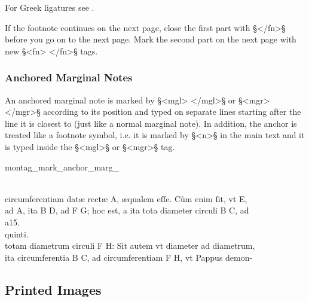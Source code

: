 \begin{crossref}
For Greek ligatures see .
\end{crossref}

\begin{note}
If the footnote continues on the next page, close the first part with §</fn>§ before you go on to the next page. Mark the second part on the next page with new §<fn> </fn>§ tags.
\end{note}


\subsubsection{Anchored Marginal Notes}
\label{section anchored marginal notes}

\begin{mainruleLessImportant}
An anchored marginal note is marked by §<mgl> </mgl>§ or §<mgr> </mgr>§ according to its position and typed on separate lines starting after the line it is closest to (just like a normal marginal note). In addition, the anchor is treated like a footnote symbol, i.e. it is marked by §<n>§ in the main text and it is typed inside the §<mgl>§ or §<mgr>§ tag.
\end{mainruleLessImportant}

\begin{sampleImage}{montag_mark_anchor_marg_} %
\begin{typeLatin}
 \someText \\
circumferentiam datæ rectæ A, æqualem eſſe. Cùm enim ſit, vt E,\\
ad A, ita B D, ad F G; hoc est,  \bold{_}a\bold{_}\bold{>} ita tota diameter circuli B C, ad\\
 a\bold{>}15.\\
\bold{_}quinti\bold{_}.\\
totam diametrum circuli F H: Sit autem vt diameter ad diametrum,\\
ita circumferentia B C, ad circumferentiam F H, vt Pappus demon- \\
\someText {}
\end{typeLatin}
\end{sampleImage}



\label{section anchored comments}




\tocspace
\subsection{Printed Images}

